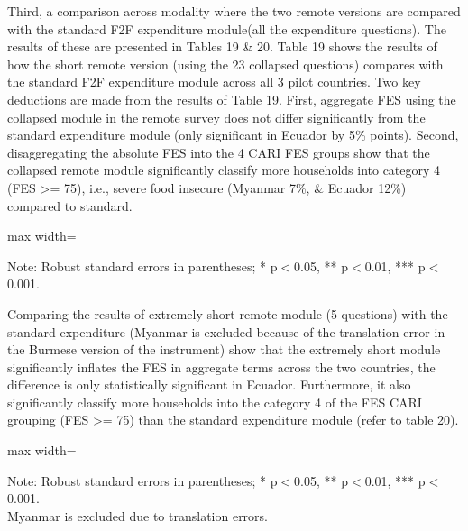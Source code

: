 \documentclass[11pt,harvard]{article}
\begin{document}
Third, a comparison across modality where the two remote versions are compared with the standard F2F expenditure module(all the expenditure questions). The results of these are presented in Tables 19 \& 20. 
Table 19 shows the results of how the short remote version (using the 23 collapsed questions) compares with the standard F2F expenditure module across all 3 pilot countries. Two key deductions are made from the results of Table 19. First, aggregate FES using the collapsed module in the remote survey does not differ significantly from the standard expenditure module (only significant in Ecuador by 5\% points). Second, disaggregating the absolute FES into the 4 CARI FES groups show that the collapsed remote module significantly classify more households into category 4 (FES >= 75), i.e., severe food insecure (Myanmar 7\%, \& Ecuador 12\%) compared to standard. 

\begin{table}[htbp]
	\centering
	\begin{adjustbox}{max width=\textwidth}
		\begin{threeparttable}
			\caption{Impact of Module Length on Expenditure and FES: F2F vs. Remote Long}
			\scriptsize
			 
			\label{tab:FES_F2F_Long_All_Country}
			\begin{tablenotes}
				\item Note: Robust standard errors in parentheses; * p$<$0.05, ** p$<$0.01, *** p$<$0.001. 
			\end{tablenotes}
		\end{threeparttable}
	\end{adjustbox}
\end{table}

Comparing the results of extremely short remote module (5 questions) with the standard expenditure (Myanmar is excluded because of the translation error in the Burmese version of the instrument) show that the extremely short module significantly inflates the FES in aggregate terms across the two countries, the difference is only statistically significant in Ecuador. Furthermore, it also significantly classify more households into the category 4 of the FES CARI grouping (FES >= 75) than the standard expenditure module (refer to table 20).

\begin{table}[htbp]
	\centering
	\begin{adjustbox}{max width=\textwidth}
		\begin{threeparttable}
			\caption{Impact of Module Length on Expenditure and FES: F2F vs. Remote Short}
			\scriptsize
			 
			\label{tab:FES_F2F_Short_ECU_CAR}
			\begin{tablenotes}
				\item Note: Robust standard errors in parentheses; * p$<$0.05, ** p$<$0.01, *** p$<$0.001. \\
				Myanmar is excluded due to translation errors.
			\end{tablenotes}
		\end{threeparttable}
	\end{adjustbox}
\end{table}
\end{document}
